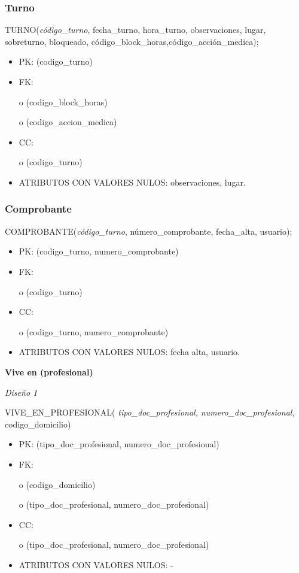 \documentclass[a4paper,11pt]{article}
\begin{document}
\subsubsection{\textbf{Turno}}

TURNO(\emph{código\_turno}, fecha\_turno, hora\_turno, observaciones, lugar, sobreturno, 
bloqueado, código\_block\_horas,código\_acción\_medica);

\begin{itemize}
\item PK: (codigo\_turno)

\item FK: 

o (codigo\_block\_horas)

o (codigo\_accion\_medica)

\item CC:

o (codigo\_turno)

\item ATRIBUTOS CON VALORES NULOS:  observaciones, lugar.\label{HToc293405842}
\end{itemize}

\subsubsection{\textbf{Comprobante}}

COMPROBANTE(\emph{código\_turno}, número\_comprobante, fecha\_alta, usuario);

\begin{itemize}
\item PK: (codigo\_turno, numero\_comprobante)

\item FK: 

o (codigo\_turno)

\item CC:

o (codigo\_turno, numero\_comprobante)

\item ATRIBUTOS CON VALORES NULOS:  fecha alta, usuario.
\end{itemize}

\textbf{Vive en (profesional)}

\textit{Diseño 1}

VIVE\_EN\_PROFESIONAL(\emph{ tipo\_doc\_profesional, numero\_doc\_profesional, 
}codigo\_domicilio)

\begin{itemize}
\item PK: (tipo\_doc\_profesional, numero\_doc\_profesional)

\item FK: 

o (codigo\_domicilio)

o (tipo\_doc\_profesional, numero\_doc\_profesional)

\item CC:

o (tipo\_doc\_profesional, numero\_doc\_profesional)

\item ATRIBUTOS CON VALORES NULOS: -
\end{itemize}
\end{document}
